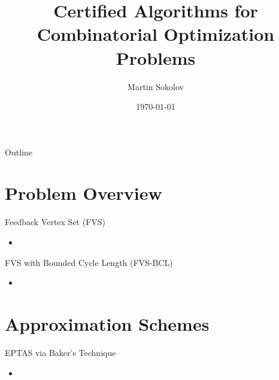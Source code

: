 \documentclass{beamer}
\title{Certified Algorithms for Combinatorial Optimization Problems}
\author{Martin Sokolov}
\institute{Utrecht University}
\date{\today}
\begin{document}
\begin{frame}
  \titlepage
\end{frame}

\begin{frame}{Outline}
  \tableofcontents
\end{frame}

\section{Problem Overview}

\begin{frame}{Feedback Vertex Set (FVS)}
  \begin{itemize}
    \item 
  \end{itemize}
\end{frame}

\begin{frame}{FVS with Bounded Cycle Length (FVS-BCL)}
  \begin{itemize}
    \item 
  \end{itemize}
\end{frame}

\section{Approximation Schemes}

\begin{frame}{EPTAS via Baker's Technique}
  \begin{itemize}
    \item
  \end{itemize}
\end{frame}
\end{document}
